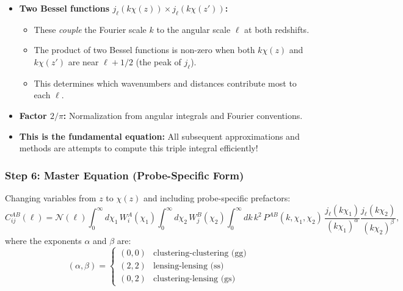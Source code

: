 \begin{itemize}[leftmargin=1.5cm]
    \item \textbf{Two Bessel functions $j_\ell(k\chi(z)) \times j_\ell(k\chi(z'))$:} 
        \begin{itemize}
            \item These \emph{couple} the Fourier scale $k$ to the angular scale $\ell$ at both redshifts.
            \item The product of two Bessel functions is non-zero when both $k\chi(z)$ and $k\chi(z')$ are near $\ell + 1/2$ (the peak of $j_\ell$).
            \item This determines which wavenumbers and distances contribute most to each $\ell$.
        \end{itemize}
    
    \item \textbf{Factor $2/\pi$:} Normalization from angular integrals and Fourier conventions.
    
    \item \textbf{This is the fundamental equation:} All subsequent approximations and methods are attempts to compute this triple integral efficiently!
\end{itemize}

\subsubsection{Step 6: Master Equation (Probe-Specific Form)}

Changing variables from $z$ to $\chi(z)$ and including probe-specific prefactors:
\begin{equation}
    C^{AB}_{ij}(\ell) = \mathcal{N}(\ell)
    \int_0^\infty d\chi_1\, W^A_i(\chi_1)
    \int_0^\infty d\chi_2\, W^B_j(\chi_2)
    \int_0^\infty dk\, k^2\, P^{AB}(k,\chi_1,\chi_2)\,
    \frac{j_\ell(k\chi_1)}{(k\chi_1)^\alpha}
    \frac{j_\ell(k\chi_2)}{(k\chi_2)^\beta},
    \label{eq:Cl_full}
\end{equation}
where the exponents $\alpha$ and $\beta$ are:
\begin{equation}
    (\alpha, \beta) = \begin{cases}
        (0, 0) & \text{clustering-clustering (gg)} \\
        (2, 2) & \text{lensing-lensing (ss)} \\
        (0, 2) & \text{clustering-lensing (gs)}
    \end{cases}
\end{equation}

